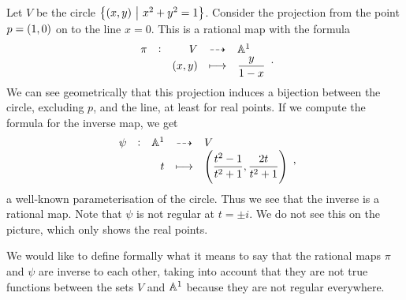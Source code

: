 \pagebreak

\begin{example*}
Let $ V $ be the circle $ \cbr{\br{x, y} \st x^2 + y^2 = 1} $. Consider the projection from the point $ p = \br{1, 0} $ on to the line $ x = 0 $. This is a rational map with the formula
$$
\begin{array}{ccrcl}
\pi & : & V & \dashrightarrow & \AA^1 \\
& & \br{x, y} & \longmapsto & \dfrac{y}{1 - x}
\end{array}.
$$
We can see geometrically that this projection induces a bijection between the circle, excluding $ p $, and the line, at least for real points. If we compute the formula for the inverse map, we get
$$
\begin{array}{ccrcl}
\psi & : & \AA^1 & \dashrightarrow & V \\
& & t & \longmapsto & \br{\dfrac{t^2 - 1}{t^2 + 1}, \dfrac{2t}{t^2 + 1}}
\end{array},
$$
a well-known parameterisation of the circle. Thus we see that the inverse is a rational map. Note that $ \psi $ is not regular at $ t = \pm i $. We do not see this on the picture, which only shows the real points.
\end{example*}

We would like to define formally what it means to say that the rational maps $ \pi $ and $ \psi $ are inverse to each other, taking into account that they are not true functions between the sets $ V $ and $ \AA^1 $ because they are not regular everywhere.

